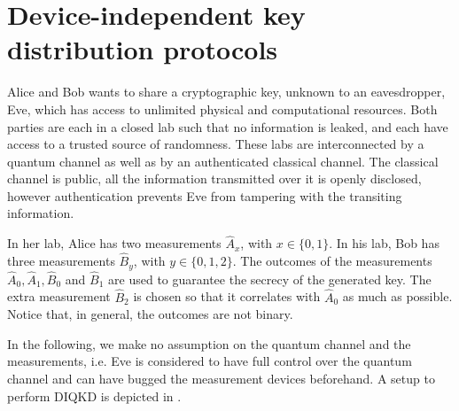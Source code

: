 \chapter{Device-independent key distribution protocols}
\label{chap:diqkd}

Alice and Bob wants to share a cryptographic key, unknown to an eavesdropper, Eve, which has access to unlimited physical and computational resources.
Both parties are each in a closed lab such that no information is leaked, and each have access to a trusted source of randomness.
These labs are interconnected by a quantum channel as well as by an authenticated classical channel.
The classical channel is public, all the information transmitted over it is openly disclosed, however authentication prevents Eve from tampering with the transiting information.

In her lab, Alice has two measurements $\hat{A}_x$, with $x\in \{0,1\}$.
In his lab, Bob has three measurements $\hat{B}_y$, with $y \in \{0,1,2\}$.
The outcomes of the measurements $\hat{A}_0,\hat{A}_1,\hat{B}_0$ and $\hat{B}_1$ are used to guarantee the secrecy of the generated key.
The extra measurement $\hat{B}_2$ is chosen so that it correlates with $\hat{A}_0$ as much as possible.
Notice that, in general, the outcomes are not binary.

In the following, we make no assumption on the quantum channel and the measurements, i.e. Eve is considered to have full control over the quantum channel and can have bugged the measurement devices beforehand.
A setup to perform DIQKD is depicted in .

\medbreak

